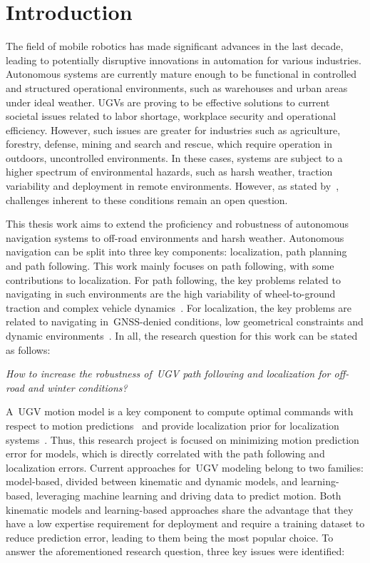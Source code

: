 \documentclass[12pt,letterpaper,oneside]{article}
\begin{document}
\makeCustomTitle
\thispagestyle{titlePage}


\section{Introduction}
\label{sec:introduction}

The field of mobile robotics has made significant advances in the last decade, leading to potentially disruptive innovations in automation for various industries.
Autonomous systems are currently mature enough to be functional in controlled and structured operational environments, such as warehouses and urban areas under ideal weather.
\Acp{UGV} are proving to be effective solutions to current societal issues related to labor shortage, workplace security and operational efficiency. 
However, such issues are greater for industries such as agriculture, forestry, defense, mining and search and rescue,  which require operation in outdoors, uncontrolled environments.
In these cases, systems are subject to a higher spectrum of environmental hazards, such as harsh weather, traction variability and deployment in remote environments.
However, as stated by~\citet{VanBrummelen2018}, challenges inherent to these conditions remain an open question.

This thesis work aims to extend the proficiency and robustness of autonomous navigation systems to off-road environments and harsh weather. 
Autonomous navigation can be split into three key components: localization, path planning and path following. 
This work mainly focuses on path following, with some contributions to localization.
For path following, the key problems related to navigating in such environments are the high variability of wheel-to-ground traction and complex vehicle dynamics~\citep{Baril2020}.
For localization, the key problems are related to navigating in~\ac{GNSS}-denied conditions, low geometrical constraints and dynamic environments~\citep{Baril2022}.
In all, the research question for this work can be stated as follows:

\begin{center}
	\emph{
		How to increase the robustness of~\ac{UGV} path following and localization for off-road and winter conditions?
	}
\end{center}

A~\ac{UGV} motion model is a key component to compute optimal commands with respect to motion predictions~\citep{Brunke2022} and provide localization prior for localization systems~\citep{Dumbgen2023}. 
Thus, this research project is focused on minimizing motion prediction error for models, which is directly correlated with the path following and localization errors. 
Current approaches for~\ac{UGV} modeling belong to two families: model-based, divided between kinematic and dynamic models, and learning-based, leveraging machine learning and driving data to predict motion.
Both kinematic models and learning-based approaches share the advantage that they have a low expertise requirement for deployment and require a training dataset to reduce prediction error, leading to them being the most popular choice.
To answer the aforementioned research question, three key issues were identified:
\end{document}
